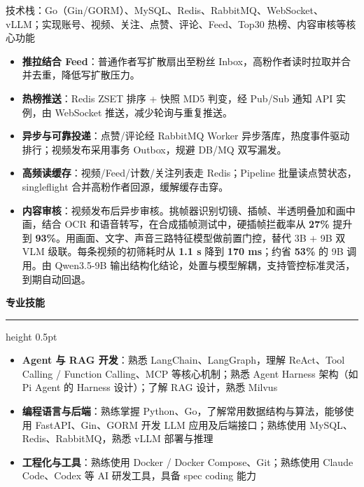 \documentclass[10pt,a4paper,fontset=none]{ctexart}
\newcommand{\cvsection}[1]{%
  \vspace{24pt}
  {\color{accenttext}\bfseries\fontsize{14}{17}\selectfont #1\par}%
  \vspace{1pt}
  {\color{accent!45}\hrule height 0.5pt}%
  \vspace{6pt}
}
\begin{document}
技术栈：Go（Gin/GORM）、MySQL、Redis、RabbitMQ、WebSocket、vLLM；实现账号、视频、关注、点赞、评论、Feed、Top30 热榜、内容审核等核心功能

\begin{itemize}
  \item \textbf{推拉结合 Feed}：普通作者写扩散扇出至粉丝 Inbox，高粉作者读时拉取并合并去重，降低写扩散压力。
  \item \textbf{热榜推送}：Redis ZSET 排序 + 快照 MD5 判变，经 Pub/Sub 通知 API 实例，由 WebSocket 推送，减少轮询与重复推送。
  \item \textbf{异步与可靠投递}：点赞/评论经 RabbitMQ Worker 异步落库，热度事件驱动排行；视频发布采用事务 Outbox，规避 DB/MQ 双写漏发。
  \item \textbf{高频读缓存}：视频/Feed/计数/关注列表走 Redis；Pipeline 批量读点赞状态，singleflight 合并高粉作者回源，缓解缓存击穿。
  \item \textbf{内容审核}：视频发布后异步审核。挑帧器识别切镜、插帧、半透明叠加和画中画，结合 OCR 和语音转写，在合成插帧测试中，硬插帧拦截率从 \textbf{27\%} 提升到 \textbf{93\%}。用画面、文字、声音三路特征模型做前置门控，替代 3B + 9B 双 VLM 级联。每条视频的初筛耗时从 \textbf{1.1 s} 降到 \textbf{170 ms}；约省 \textbf{53\%} 的 9B 调用。由 Qwen3.5-9B 输出结构化结论，处置与模型解耦，支持管控标准灵活，到期自动回退。
\end{itemize}

\cvsection{专业技能}
\begin{itemize}
  \item \textbf{Agent 与 RAG 开发}：熟悉 LangChain、LangGraph，理解 ReAct、Tool Calling / Function Calling、MCP 等核心机制；熟悉 Agent Harness 架构（如 Pi Agent 的 Harness 设计）；了解 RAG 设计，熟悉 Milvus
  \item \textbf{编程语言与后端}：熟练掌握 Python、Go，了解常用数据结构与算法，能够使用 FastAPI、Gin、GORM 开发 LLM 应用及后端接口；熟练使用 MySQL、Redis、RabbitMQ，熟悉 vLLM 部署与推理
  \item \textbf{工程化与工具}：熟练使用 Docker / Docker Compose、Git；熟练使用 Claude Code、Codex 等 AI 研发工具，具备 spec coding 能力
\end{itemize}
\end{document}
